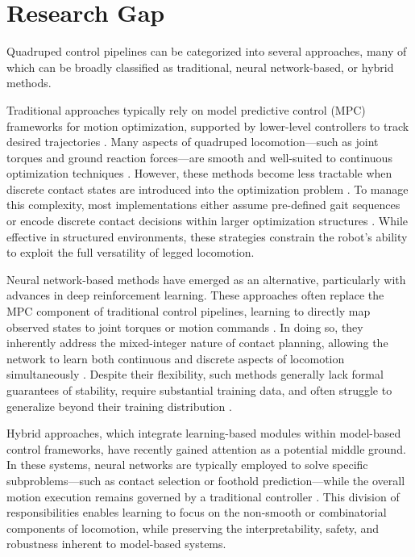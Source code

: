 \section{Research Gap}
\label{sec:introduction-research-gap}

Quadruped control pipelines can be categorized into several
approaches, many of which can be broadly classified as traditional,
neural network-based, or hybrid methods.

Traditional approaches typically rely on model predictive control
(MPC) frameworks for motion optimization, supported by lower-level
controllers to track desired trajectories
\cite{Kim2019highly-dynamic}. Many aspects of quadruped
locomotion—such as joint torques and ground reaction forces—are
smooth and well-suited to continuous optimization techniques
\cite{Wensing2022Nov}. However, these methods become less tractable
when discrete contact states are introduced into the optimization
problem \cite{Geisert2019contact-planning}. To manage this
complexity, most implementations either assume pre-defined gait
sequences \cite{Chai2022survey, Fan2024survey} or encode discrete
contact decisions within larger optimization structures
\cite{winkler_gait_2018}. While effective in structured environments,
these strategies constrain the robot's ability to exploit the full
versatility of legged locomotion.

Neural network-based methods have emerged as an alternative,
particularly with advances in deep reinforcement learning. These
approaches often replace the MPC component of traditional control
pipelines, learning to directly map observed states to joint torques
or motion commands \cite{Gurram2024survey}. In doing so, they
inherently address the mixed-integer nature of contact planning,
allowing the network to learn both continuous and discrete aspects of
locomotion simultaneously \cite{Wensing2022Nov}. Despite their
flexibility, such methods generally lack formal guarantees of
stability, require substantial training data, and often struggle to
generalize beyond their training distribution \cite{Gurram2024survey}.

Hybrid approaches, which integrate learning-based modules within
model-based control frameworks, have recently gained attention as a
potential middle ground. In these systems, neural networks are
typically employed to solve specific subproblems—such as contact
selection or foothold prediction—while the overall motion execution
remains governed by a traditional controller \cite{Bao2024survey,
Wang2022Oct}. This division of responsibilities enables learning to
focus on the non-smooth or combinatorial components of locomotion,
while preserving the interpretability, safety, and robustness
inherent to model-based systems.

